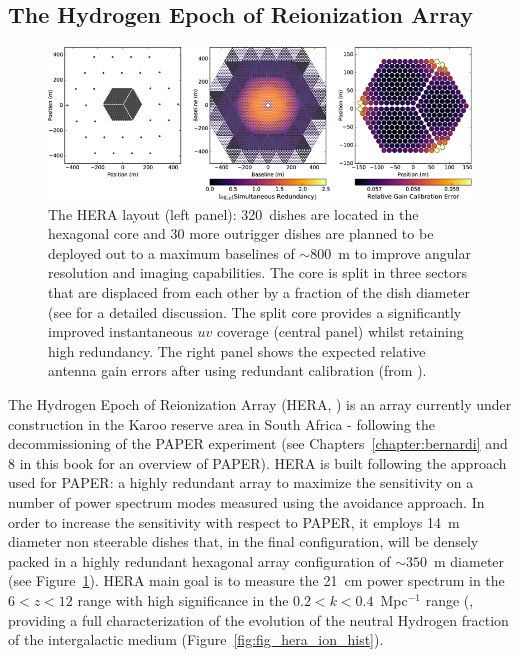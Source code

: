 \subsection{The Hydrogen Epoch of Reionization Array}
\begin{figure}[]
\begin{center}
\includegraphics[width=1.\textwidth]{Koopmans_Bernardi/hera_layout}
\end{center}
\caption{The HERA layout (left panel): 320~dishes are located in the hexagonal core and 30 more outrigger dishes are planned to be deployed out to a maximum baselines of $\sim 800$~m to improve angular resolution and imaging capabilities. The core is split in three sectors that are displaced from each other by a fraction of the dish diameter (see \cite{dillon16} for a detailed discussion. The split core provides a significantly improved instantaneous $uv$ coverage (central panel) whilst retaining high redundancy. The right panel shows the expected relative antenna gain errors after using redundant calibration (from \cite{dillon16}).}
\label{fig:fig_hera}
\end{figure}
The Hydrogen Epoch of Reionization Array (HERA, \cite{deboer17}) is an array currently under construction in the Karoo reserve area in South Africa - following the decommissioning of the PAPER experiment (see Chapters~\ref{chapter:bernardi} and 8 in this book for an overview of PAPER). HERA is built following the approach used for PAPER: a highly redundant array to maximize the sensitivity on a number of power spectrum modes measured using the avoidance approach. In order to increase the sensitivity with respect to PAPER, it employs 14~m diameter non steerable dishes that, in the final configuration, will be densely packed in a highly redundant hexagonal array configuration of $\sim 350$~m diameter (see Figure~\ref{fig:fig_hera}). 
HERA main goal is to measure the 21~cm power spectrum in the $6 < z < 12 $ range with high significance in the $0.2 < k < 0.4$~Mpc$^{-1}$ range (\cite{pober14}, providing a full characterization of the evolution of the neutral Hydrogen fraction of the intergalactic medium (Figure~\ref{fig:fig_hera_ion_hist}).
